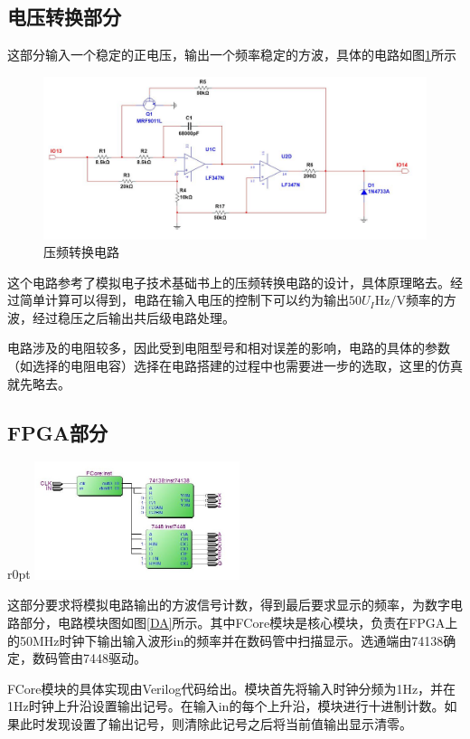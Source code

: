 \documentclass[UTF8,a4paper]{paper}
\begin{document}
\subsection{电压转换部分}
这部分输入一个稳定的正电压，输出一个频率稳定的方波，具体的电路如图\ref{VF}所示
\begin{figure}[b]
\centering
\includegraphics[width=\textwidth]{VF.jpg}
\caption{压频转换电路}
\label{VF}
\end{figure}

这个电路参考了模拟电子技术基础书上的压频转换电路的设计，具体原理略去。经过简单计算可以得到，电路在输入电压的控制下可以约为输出$50U_I\mathrm{Hz/V}$频率的方波，经过稳压之后输出共后级电路处理。

电路涉及的电阻较多，因此受到电阻型号和相对误差的影响，电路的具体的参数（如选择的电阻电容）选择在电路搭建的过程中也需要进一步的选取，这里的仿真就先略去。
\clearpage
\subsection{FPGA部分}
\begin {wrapfigure}{r}{0pt}
\includegraphics [width=60mm]{Block.jpg}
\caption{频率计数电路布置}
\label{DA}
\end {wrapfigure}
这部分要求将模拟电路输出的方波信号计数，得到最后要求显示的频率，为数字电路部分，电路模块图如图\ref{DA}所示。其中FCore模块是核心模块，负责在FPGA上的50MHz时钟下输出输入波形in的频率并在数码管中扫描显示。选通端由74138确定，数码管由7448驱动。

FCore模块的具体实现由Verilog代码给出。模块首先将输入时钟分频为1Hz，并在1Hz时钟上升沿设置输出记号。在输入in的每个上升沿，模块进行十进制计数。如果此时发现设置了输出记号，则清除此记号之后将当前值输出显示清零。
\end{document}
